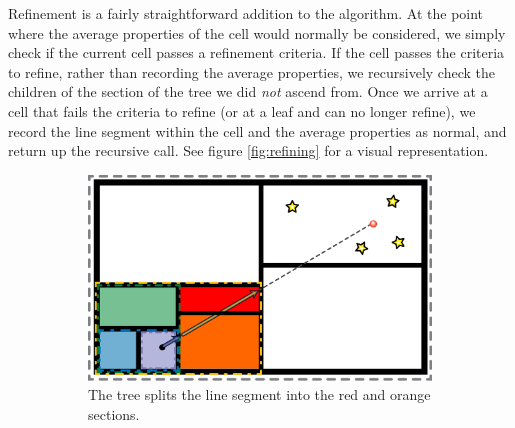 Refinement is a fairly straightforward addition to the algorithm. At the point where the average properties of the cell would normally be considered, we simply check if the current cell passes a refinement criteria. If the cell passes the criteria to refine, rather than recording the average properties, we recursively check the children of the section of the tree we did \emph{not} ascend from. Once we arrive at a cell that fails the criteria to refine (or at a leaf and can no longer refine), we record the line segment within the cell and the average properties as normal, and return up the recursive call. See figure \ref{fig:refining} for a visual representation.

\begin{figure}
        \centering
        \begin{subfigure}[b]{0.45\textwidth}
                \includegraphics[width=\textwidth]{graphics/refinement.eps}
                \caption{The tree splits the line segment into the red and orange sections.}
                \label{fig:refinetree}
        \end{subfigure}
        ~ 
        \begin{subfigure}[b]{0.45\textwidth}

\end{subfigure}
\end{figure}
